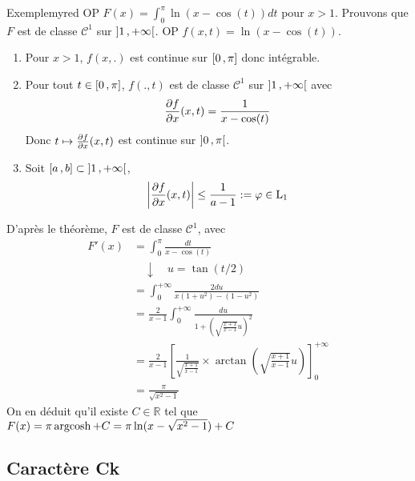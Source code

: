     \begin{omed}{Exemple}{myred}
        OP $F(x) = \int_{0}^{\pi} \ln(x - \cos(t))dt$ pour $x > 1$. Prouvons que $F$ est de classe $\mathcal{C}^1$ sur $\left] 1 \, , +\infty \right[$. OP $f(x,t) = \ln(x - \cos(t))$.
        \begin{enumerate}
            \item Pour $x > 1$, $f(x,.)$ est continue sur $\left[ 0 \, , \pi \right]$ donc intégrable.
            \item Pour tout $t \in \left[ 0 \, , \pi \right]$, $f(.,t)$ est de classe $\mathcal{C}^1$ sur $\left] 1 \, , +\infty \right[$ avec 
            \[ \frac{\partial f}{\partial x}(x,t) = \frac{1}{x - \cos(t)} \]   
            Donc $t \mapsto \frac{\partial f}{\partial x}(x,t)$ est continue sur $\left] 0 \, , \pi \right[$.
            \item Soit $\left[ a \, , b \right] \subset \left] 1 \, , +\infty \right[$, 
            \[ \left\lvert \frac{\partial f}{\partial x}(x,t)\right\rvert \leq \frac{1}{a-1} := \varphi \in \operatorname{L}_1 \]   
        \end{enumerate}
        D’après le théorème, $F$ est de classe $\mathcal{C}^1$, avec 
        \begin{align*}
            F'(x) &= \int_{0}^{\pi} \frac{dt}{x - \cos(t)} \\
            &\quad \downarrow \quad u = \tan(t / 2) \\
            &= \int_{0}^{+\infty} \frac{2 du}{x(1 + u^2) - (1 - u^2)} \\
            &= \frac{2}{x-1} \int_{0}^{+\infty} \frac{du}{1 + \left(\sqrt{\frac{x+1}{x-1}} u\right)^2} \\
            &= \frac{2}{x-1} \left[\frac{1}{\sqrt{\frac{x+1}{x-1}}} \times \arctan\left(\sqrt{\frac{x+1}{x-1}} u\right)\right]^{+\infty}_0 \\
            &= \frac{\pi}{\sqrt{x^2 - 1}}
        \end{align*}
        On en déduit qu’il existe $C \in \mathbb{R}$ tel que $F(x) = \pi \operatorname{argcosh} + C = \pi \ln(x - \sqrt{x^2 - 1}) + C$
    \end{omed}

    \subsection{Caractère Ck}

